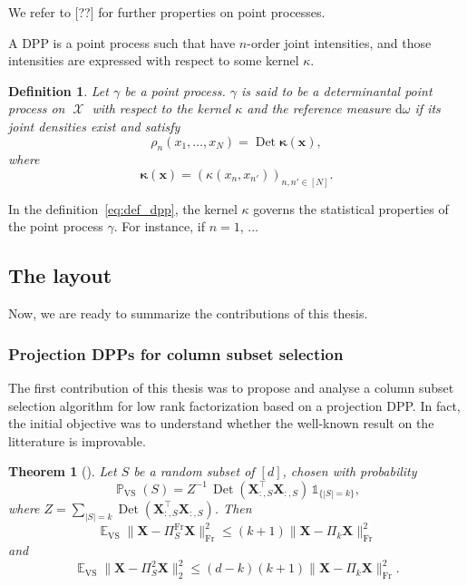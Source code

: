 \documentclass[twoside,11pt]{book}
\newtheorem{theorem}{Theorem}
\newtheorem{definition}{Definition}
\DeclareMathOperator{\Det}{Det}
\DeclareMathOperator{\Fr}{\mathrm{Fr}}
\DeclareMathOperator{\VS}{\mathrm{VS}}
\DeclareMathOperator{\Tran}{\intercal}
\DeclareMathOperator{\EX}{\mathbb{E}}
\DeclareMathOperator{\Prb}{\mathbb{P}}
\DeclareMathOperator{\X}{\mathcal{X}}
\begin{document}
We refer to [??] for further properties on point processes.


A DPP is a point process such that have $n$-order joint intensities, and those intensities are expressed with respect to some kernel $\kappa$.
\begin{definition}\label{eq:def_dpp}
Let $\gamma$ be a point process. $\gamma$ is said to be a determinantal point process on $\X$ with respect to the kernel $\kappa$ and the reference measure $\mathrm{d}\omega$ if its joint densities exist and satisfy
\begin{equation}
\rho_{n}(x_{1}, \dots, x_{N}) = \Det \bm{\kappa}(\bm{x}),
\end{equation}
where
\begin{equation}
\bm{\kappa}(\bm{x}) = (\kappa(x_{n},x_{n'}))_{n,n' \in [N]}.
\end{equation}
\end{definition}

In the definition~\eqref{eq:def_dpp}, the kernel $\kappa$ governs the statistical properties of the point process $\gamma$. For instance, if $n =1$, ...


\clearpage



\subsection{The layout}
Now, we are ready to summarize the contributions of this thesis.
\subsubsection{Projection DPPs for column subset selection}
The first contribution of this thesis was to propose and analyse a column subset selection algorithm for low rank factorization based on a projection DPP. In fact, the initial objective was to understand whether the well-known result on the litterature is improvable.

\begin{theorem}[\citealp{DRVW06}]
  \label{thrm:volume_sampling_theorem_introduction}
Let $S$ be a random subset of $[d]$, chosen with probability
\begin{equation}
\Prb_{\VS}(S) = Z^{-1} \,\Det(\bm{X}_{:,S}^{\Tran}\bm{X}_{:,S}^{})\, \mathbb{1}_{\{|S| = k \}},
\label{e:vs}
\end{equation}
where $Z = \sum\limits_{|S| = k} \Det(\bm{X}_{:,S}^{\Tran}\bm{X}_{:,S}^{})$.
Then
\begin{equation}
\EX_{\VS} \| \bm{X} - \Pi_{S}^{\Fr}\bm{X} \|_{\Fr}^{2} \leq (k+1)\| \bm{X} - \Pi_{k}\bm{X} \|_{\Fr}^{2}
\label{e:vsBoundFr}
\end{equation}
and
\begin{equation}
\EX_{\VS} \| \bm{X} - \Pi_{S}^{2}\bm{X} \|_{2}^{2} \leq (d-k)(k+1)\| \bm{X} - \Pi_{k}\bm{X} \|_{\Fr}^{2} .
\label{e:vsBound2}
\end{equation}
\end{theorem}
\end{document}

